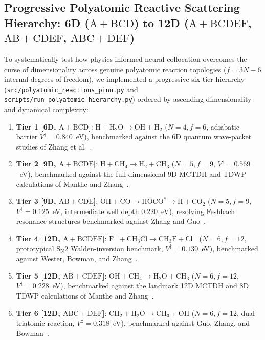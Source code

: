 \documentclass[11pt,a4paper]{article}
\begin{document}
\subsection{Progressive Polyatomic Reactive Scattering Hierarchy: 6D ($\mathrm{A+BCD}$) to 12D ($\mathrm{A+BCDEF}$, $\mathrm{AB+CDEF}$, $\mathrm{ABC+DEF}$)}
\label{sec:polyatomic_hierarchy}

To systematically test how physics-informed neural collocation overcomes the curse of dimensionality across genuine polyatomic reaction topologies ($f = 3N - 6$ internal degrees of freedom), we implemented a progressive six-tier hierarchy (\texttt{src/}\allowbreak\texttt{polyatomic\_}\allowbreak\texttt{reactions\_}\allowbreak\texttt{pinn.py} and \texttt{scripts/}\allowbreak\texttt{run\_}\allowbreak\texttt{polyatomic\_}\allowbreak\texttt{hierarchy.py}) ordered by ascending dimensionality and dynamical complexity:
\begin{enumerate}
 \item \textbf{Tier 1 [6D, $\mathrm{A + BCD}$]}: $\mathrm{H + H_2O \to OH + H_2}$ ($N=4, f=6$, adiabatic barrier $V^\ddagger = 0.840$~eV), benchmarked against the 6D quantum wave-packet studies of Zhang et al.~\cite{zhang2000h2o}.
 \item \textbf{Tier 2 [9D, $\mathrm{A + BCDE}$]}: $\mathrm{H + CH_4 \to H_2 + CH_3}$ ($N=5, f=9$, $V^\ddagger = 0.569$~eV), benchmarked against the full-dimensional 9D MCTDH and TDWP calculations of Manthe and Zhang~\cite{manthe2011ch4}.
 \item \textbf{Tier 3 [9D, $\mathrm{AB + CDE}$]}: $\mathrm{OH + CO \to HOCO^* \to H + CO_2}$ ($N=5, f=9$, $V^\ddagger = 0.125$~eV, intermediate well depth $0.220$~eV), resolving Feshbach resonance structures benchmarked against Zhang and Guo~\cite{zhang2013ohco}.
 \item \textbf{Tier 4 [12D, $\mathrm{A + BCDEF}$]}: $\mathrm{F^- + CH_3Cl \to CH_3F + Cl^-}$ ($N=6, f=12$, prototypical $\mathrm{S_N2}$ Walden-inversion benchmark, $V^\ddagger = 0.130$~eV), benchmarked against Wester, Bowman, and Zhang~\cite{wester2008sn2}.
 \item \textbf{Tier 5 [12D, $\mathrm{AB + CDEF}$]}: $\mathrm{OH + CH_4 \to H_2O + CH_3}$ ($N=6, f=12$, $V^\ddagger = 0.228$~eV), benchmarked against the landmark 12D MCTDH and 8D TDWP calculations of Manthe and Zhang~\cite{manthe2015ohch4}.
 \item \textbf{Tier 6 [12D, $\mathrm{ABC + DEF}$]}: $\mathrm{CH_2 + H_2O \to CH_3 + OH}$ ($N=6, f=12$, dual-triatomic reaction, $V^\ddagger = 0.318$~eV), benchmarked against Guo, Zhang, and Bowman~\cite{bowman2016h2o2}.
\end{enumerate}
\end{document}
